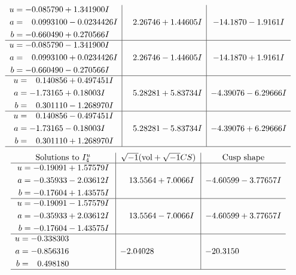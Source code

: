 \documentclass[1p]{elsarticle_modified}
\theoremstyle{definition}
\newcommand{\I}{\sqrt{-1}}
\begin{document}
$$\begin{array}{c|c|c}
\begin{aligned}
u &= -0.085790 + 1.341900 I \\
a &= \phantom{-}0.0993100 - 0.0234426 I \\
b &= -0.660490 + 0.270566 I\end{aligned}
 & \phantom{-}2.26746 + 1.44605 I & -14.1870 - 1.9161 I \\ \hline\begin{aligned}
u &= -0.085790 - 1.341900 I \\
a &= \phantom{-}0.0993100 + 0.0234426 I \\
b &= -0.660490 - 0.270566 I\end{aligned}
 & \phantom{-}2.26746 - 1.44605 I & -14.1870 + 1.9161 I \\ \hline\begin{aligned}
u &= \phantom{-}0.140856 + 0.497451 I \\
a &= -1.73165 + 0.18003 I \\
b &= \phantom{-}0.301110 - 1.268970 I\end{aligned}
 & \phantom{-}5.28281 + 5.83734 I & -4.39076 - 6.29666 I \\ \hline\begin{aligned}
u &= \phantom{-}0.140856 - 0.497451 I \\
a &= -1.73165 - 0.18003 I \\
b &= \phantom{-}0.301110 + 1.268970 I\end{aligned}
 & \phantom{-}5.28281 - 5.83734 I & -4.39076 + 6.29666 I\\
 \hline 
 \end{array}$$\newpage$$\begin{array}{c|c|c}  
\text{Solutions to }I^u_{4}& \I (\text{vol} + \sqrt{-1}CS) & \text{Cusp shape}\\
 \hline 
\begin{aligned}
u &= -0.19091 + 1.57579 I \\
a &= -0.35933 - 2.03612 I \\
b &= -0.17604 + 1.43575 I\end{aligned}
 & \phantom{-}13.5564 + 7.0066 I & -4.60599 - 3.77657 I \\ \hline\begin{aligned}
u &= -0.19091 - 1.57579 I \\
a &= -0.35933 + 2.03612 I \\
b &= -0.17604 - 1.43575 I\end{aligned}
 & \phantom{-}13.5564 - 7.0066 I & -4.60599 + 3.77657 I \\ \hline\begin{aligned}
u &= -0.338303\phantom{ +0.000000I} \\
a &= -0.856316\phantom{ +0.000000I} \\
b &= \phantom{-}0.498180\phantom{ +0.000000I}\end{aligned}
 & -2.04028\phantom{ +0.000000I} & -20.3150\phantom{ +0.000000I}\\
 \hline 
 \end{array}$$\newpage
\end{document}

